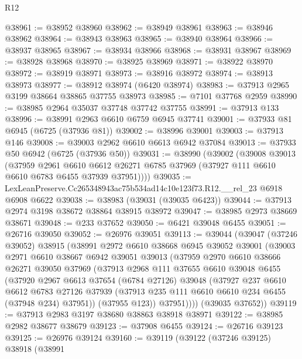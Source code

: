 \begin{lexlean}{R12}
\begin{coremodule}
@38961 := @38952 @38960
@38962 := @38949 @38961
@38963 := @38946 @38962
@38964 := @38943 @38963
@38965 := @38940 @38964
@38966 := @38937 @38965
@38967 := @38934 @38966
@38968 := @38931 @38967
@38969 := @38928 @38968
@38970 := @38925 @38969
@38971 := @38922 @38970
@38972 := @38919 @38971
@38973 := @38916 @38972
@38974 := @38913 @38973
@38977 := @38912 @38974 (@6420 @38974)
@38983 := @37913 @2965 @3199 @38664 @38865 @37755 @38973
@38985 := @7101 @37768 @2959
@38990 := @38985 @2964 @35037 @37748 @37742 @37755
@38991 := @37913 @133
@38996 := @38991 @2963 @6610 @6759 @6945 @37741
@39001 := @37933 @81 @6945 (@6725 (@37936 @81))
@39002 := @38996 @39001
@39003 := @37913 @146
@39008 := @39003 @2962 @6610 @6613 @6942 @37084
@39013 := @37933 @50 @6942 (@6725 (@37936 @50))
@39031 := @38990
    (@39002
      (@39008
        @39013
        (@37959
          @2961
          @6610
          @6612
          @26271
          @6785
          @37969
          (@37927 @111 @6610 @6610 @6783 @6455 @37939 @37951))))
@39035 := LexLeanPreserve.Cc265348943ac75b534ad14c10e123f73.R12.__rel_23 @6918 @6908 @6622
@39038 := @38983 (@39031 (@39035 @6423))
@39044 := @37913 @2974 @3198 @38672 @38864 @38915 @38972
@39047 := @38985 @2973 @38669 @38671
@39048 := @233 @37652
@39050 := @6421 @39048 @6455
@39051 := @26716 @39050
@39052 := @26976 @39051
@39113 := @39044
    (@39047
      (@37246 @39052)
      @38915
      (@38991
        @2972
        @6610
        @38668
        @6945
        @39052
        @39001
        (@39003
          @2971
          @6610
          @38667
          @6942
          @39051
          @39013
          (@37959
            @2970
            @6610
            @38666
            @26271
            @39050
            @37969
            (@37913
              @2968
              @111
              @37655
              @6610
              @39048
              @6455
              (@37920
                @2967
                @6613
                @37654
                (@6784 @27126)
                @39048
                (@37927
                  @237
                  @6610
                  @6612
                  @6783
                  @27126
                  @37939
                  (@37913 @235 @111 @6610 @6610 @234 @6455 (@37948 @234) @37951))
                (@37955 @123))
              @37951))))
      (@39035 @37652))
@39119 := @37913 @2983 @3197 @38680 @38863 @38918 @38971
@39122 := @38985 @2982 @38677 @38679
@39123 := @37908 @6455
@39124 := @26716 @39123
@39125 := @26976 @39124
@39160 := @39119
    (@39122
      (@37246 @39125)
      @38918
      (@38991

\end{coremodule}
\end{lexlean}
